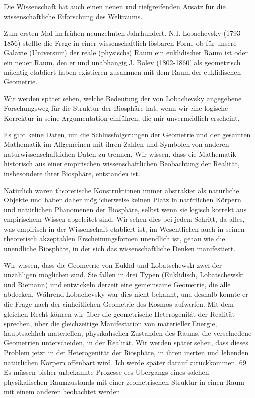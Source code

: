 \documentclass[11pt,a4paper]{book}
\begin{document}
Die Wissenschaft hat auch einen neuen und tiefgreifenden Ansatz für die wissenschaftliche Erforschung des Weltraums.



Zum ersten Mal im frühen neunzehnten Jahrhundert. N.I. Lobachevsky (1793-1856) stellte die Frage in einer wissenschaftlich lösbaren Form, ob für unsere Galaxie (Universum) der reale (physische) Raum ein euklidischer Raum ist oder ein neuer Raum, den er und unabhängig J. Boley (1802-1860) als geometrisch mächtig etabliert haben existieren zusammen mit dem Raum der euklidischen Geometrie.



Wir werden später sehen, welche Bedeutung der von Lobachevsky angegebene Forschungsweg für die Struktur der Biosphäre hat, wenn wir eine logische Korrektur in seine Argumentation einführen, die mir unvermeidlich erscheint.



Es gibt keine Daten, um die Schlussfolgerungen der Geometrie und der gesamten Mathematik im Allgemeinen mit ihren Zahlen und Symbolen von anderen naturwissenschaftlichen Daten zu trennen. Wir wissen, dass die Mathematik historisch aus einer empirischen wissenschaftlichen Beobachtung der Realität, insbesondere ihrer Biosphäre, entstanden ist.



Natürlich waren theoretische Konstruktionen immer abstrakter als natürliche Objekte und haben daher möglicherweise keinen Platz in natürlichen Körpern und natürlichen Phänomenen der Biosphäre, selbst wenn sie logisch korrekt aus empirischem Wissen abgeleitet sind. Wir sehen dies bei jedem Schritt, da alles, was empirisch in der Wissenschaft etabliert ist, im Wesentlichen auch in seinen theoretisch akzeptablen Erscheinungsformen unendlich ist, genau wie die unendliche Biosphäre, in der sich das wissenschaftliche Denken manifestiert.



Wir wissen, dass die Geometrie von Euklid und Lobatschewski zwei der unzähligen möglichen sind. Sie fallen in drei Typen (Euklidisch, Lobatschewski und Riemann) und entwickeln derzeit eine gemeinsame Geometrie, die alle abdecken. Während Lobachevsky war dies nicht bekannt, und deshalb konnte er die Frage nach der einheitlichen Geometrie des Kosmos aufwerfen. Mit dem gleichen Recht können wir über die geometrische Heterogenität der Realität sprechen, über die gleichzeitige Manifestation von materieller Energie, hauptsächlich materiellen, physikalischen Zuständen des Raums, die verschiedene Geometrien unterscheiden, in der Realität. Wir werden später sehen, dass dieses Problem jetzt in der Heterogenität der Biosphäre, in ihren inerten und lebenden natürlichen Körpern offenbart wird. Ich werde später darauf zurückkommen. 69 Es müssen bisher unbekannte Prozesse des Übergangs eines solchen physikalischen Raumzustands mit einer geometrischen Struktur in einen Raum mit einem anderen beobachtet werden.
\end{document}
